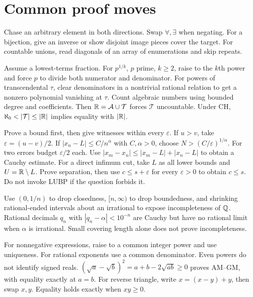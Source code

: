 \section{Common proof moves}
\label{sec:appendix:formula-sheet-proof-moves}
Chase an arbitrary element in both directions. Swap $\forall,\exists$
when negating. For a bijection, give an inverse or show disjoint image
pieces cover the target. For countable unions, read diagonals of an
array of enumerations and skip repeats.

Assume a lowest-terms fraction. For $p^{1/k}$, $p$ prime, $k\ge2$,
raise to the $k$th power and force $p$ to divide both numerator and
denominator. For powers of transcendental $\tau$, clear denominators
in a nontrivial rational relation to get a nonzero polynomial vanishing
at $\tau$. Count algebraic numbers using bounded degree and coefficients.
Then $\mathbb{R}=\mathcal A\cup\mathcal T$ forces $\mathcal T$ uncountable.
Under CH, $\aleph_0<|\mathcal T|\le|\R|$ implies equality with $|\mathbb{R}|$.

Prove a bound first, then give witnesses within every $\varepsilon$.
If $u>v$, take $\varepsilon=(u-v)/2$.
If $|x_n-L|\le C/n^\alpha$ with $C,\alpha>0$, choose $N>(C/\varepsilon)^{1/\alpha}$.
For two errors budget $\varepsilon/2$ each.
Use $|x_m-x_n|\le|x_m-L|+|x_n-L|$ to obtain a Cauchy estimate.
For a direct infimum cut, take $L$ as all lower bounds and
$U=\mathbb{R}\setminus L$. Prove separation, then use
$c\le s+\varepsilon$ for every $\varepsilon>0$ to obtain $c\le s$.
Do not invoke LUBP if the question forbids it.

Use $(0,1/n)$ to drop closedness, $[n,\infty)$ to drop boundedness,
and shrinking rational-ended intervals about an irrational to expose
incompleteness of $\mathbb{Q}$.
Rational decimals $q_n$ with $|q_n-\alpha|<10^{-n}$ are Cauchy
but have no rational limit when $\alpha$ is irrational.
Small covering length alone does not prove incompleteness.

For nonnegative expressions, raise to a common integer power and use
uniqueness. For rational exponents use a common denominator.
Even powers do not identify signed reals.
$ (\sqrt a-\sqrt b)^2=a+b-2\sqrt{ab}\ge0$ proves AM--GM,
with equality exactly at $a=b$.
For reverse triangle, write $x=(x-y)+y$, then swap $x,y$.
Equality holds exactly when $xy\ge0$.

